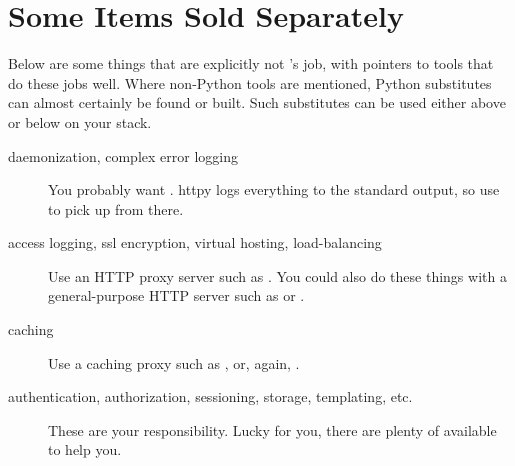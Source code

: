\section{Some Items Sold Separately}

Below are some things that are explicitly not 's job, with
pointers to tools that do these jobs well. Where non-Python tools are mentioned,
Python substitutes can almost certainly be found or built. Such substitutes can
be used either above or below  on your stack.

\begin{description}

\item[daemonization, complex error logging]
    {You probably want . httpy logs everything to the
    standard output, so use
     to pick up from
    there.}

\item[access logging, ssl encryption, virtual hosting, load-balancing]
    {Use an HTTP proxy server such as .
    You could also do these things with a general-purpose HTTP server such as
     or
    .}

\item[caching]
    {Use a caching proxy such as , or,
    again, .}

\item[authentication, authorization, sessioning, storage, templating, etc.]
    {These are your responsibility. Lucky for you, there are plenty of
     available to help
    you.}

\end{description}
